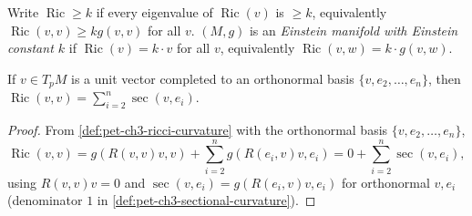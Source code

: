 \begin{definition}
  \label{def:pet-ch3-einstein-manifold}
  \leanok
  Write $\operatorname{Ric}\ge k$ if every eigenvalue of $\operatorname{Ric}(v)$ is $\ge
  k$, equivalently $\operatorname{Ric}(v,v)\ge kg(v,v)$ for all $v$. $(M,g)$ is an
  \emph{Einstein manifold with Einstein constant $k$} if $\operatorname{Ric}(v)=k\cdot v$
  for all $v$, equivalently $\operatorname{Ric}(v,w)=k\cdot g(v,w)$.
\end{definition}

\begin{proposition}
  \label{prop:pet-ch3-ricci-sectional-relation}
  \leanok
  If $v\in T_pM$ is a unit vector completed to an orthonormal basis
  $\{v,e_2,\dots,e_n\}$, then
  $\operatorname{Ric}(v,v)=\sum_{i=2}^n\sec(v,e_i)$.
\end{proposition}
\begin{proof}
  \leanok
  From \cref{def:pet-ch3-ricci-curvature} with the orthonormal basis
  $\{v,e_2,\dots,e_n\}$,
  \[
    \operatorname{Ric}(v,v)=g(R(v,v)v,v)+\sum_{i=2}^ng(R(e_i,v)v,e_i)
    =0+\sum_{i=2}^n\sec(v,e_i),
  \]
  using $R(v,v)v=0$ and $\sec(v,e_i)=g(R(e_i,v)v,e_i)$ for orthonormal $v,e_i$
  (denominator $1$ in \cref{def:pet-ch3-sectional-curvature}).
\end{proof}

